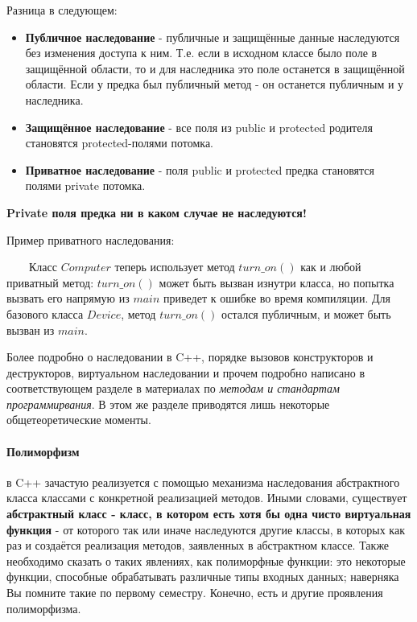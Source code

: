 Разница в следующем:
\begin{itemize}
    \item \textbf{Публичное наследование} - публичные и защищённые данные наследуются без изменения доступа к ним. Т.е. если в исходном классе было поле в защищённой области, то и для наследника это поле останется в защищённой области. Если у предка был публичный метод - он останется публичным и у наследника. 
    \item \textbf{Защищённое наследование} - все поля из public и protected родителя становятся protected-полями потомка.
    \item \textbf{Приватное наследование} - поля public и protected предка становятся полями private потомка.
\end{itemize}
\begin{notice}
    \textbf{Private поля предка ни в каком случае не наследуются!}
\end{notice}

Пример приватного наследования:
\lstset{language=C++}


$\qquad$Класс $Computer$ теперь использует метод $turn\_on()$ как и любой приватный метод: $turn\_on()$ может быть вызван изнутри класса, но попытка вызвать его напрямую из $main$ приведет к ошибке во время компиляции. Для базового класса $Device$, метод $turn\_on()$ остался публичным, и может быть вызван из $main$.

\begin{notice}
    Более подробно о наследовании в C++, порядке вызовов конструкторов и деструкторов, виртуальном наследовании и прочем подробно написано в соответствующем разделе в материалах по \textit{методам и стандартам программирвания}. В этом же разделе приводятся лишь некоторые общетеоретические моменты.
\end{notice}

\paragraph{Полиморфизм} в C++ зачастую реализуется с помощью механизма наследования абстрактного класса классами с конкретной реализацией методов. Иными словами, существует \textbf{абстрактный класс - класс, в котором есть хотя бы одна чисто виртуальная функция} - от которого так или иначе наследуются другие классы, в которых как раз и создаётся реализация методов, заявленных в абстрактном классе. Также необходимо сказать о таких явлениях, как полиморфные функции: это некоторые функции, способные обрабатывать различные типы входных данных; наверняка Вы помните такие по первому семестру. Конечно, есть и другие проявления полиморфизма. 

